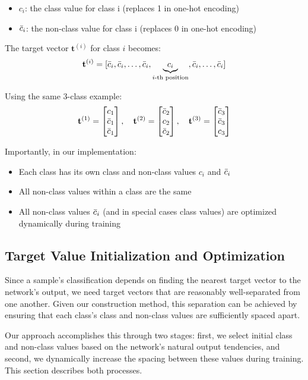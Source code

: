 \documentclass[12pt,fleqn,a4paper]{article}
\begin{document}
\begin{itemize}
\item $c_i$: the class value for class i (replaces 1 in one-hot encoding)
\item $\Bar{c}_i$: the non-class value for class i (replaces 0 in one-hot encoding)
\end{itemize}

The target vector $\mathbf{t}^{(i)}$ for class $i$ becomes:
$$\mathbf{t}^{(i)} = [\Bar{c}_i, \Bar{c}_i, \ldots, \Bar{c}_i, \underbrace{c_i}_{i\text{-th position}}, \Bar{c}_i, \ldots, \Bar{c}_i]$$

Using the same 3-class example:
$$\mathbf{t}^{(1)} = \begin{bmatrix} c_1 \\ \Bar{c}_1 \\ \Bar{c}_1 \end{bmatrix}, \quad 
\mathbf{t}^{(2)} = \begin{bmatrix} \Bar{c}_2 \\ c_2 \\ \Bar{c}_2 \end{bmatrix}, \quad 
\mathbf{t}^{(3)} = \begin{bmatrix} \Bar{c}_3 \\ \Bar{c}_3 \\ c_3 \end{bmatrix}$$

Importantly, in our implementation:
\begin{itemize}
\item Each class has its own class and non-class values $c_i$ and $\Bar{c}_i$
\item All non-class values within a class are the same
\item All non-class values $\Bar{c}_i$ (and in special cases class values) are optimized dynamically during training
\end{itemize}

\subsection{Target Value Initialization and Optimization}
Since a sample's classification depends on finding the nearest target vector to the network's output, we need target vectors that are reasonably well-separated from one another. Given our construction method, this separation can be achieved by ensuring that each class's class and non-class values are sufficiently spaced apart.

Our approach accomplishes this through two stages: first, we select initial class and non-class values based on the network's natural output tendencies, and second, we dynamically increase the spacing between these values during training. This section describes both processes.
\end{document}
